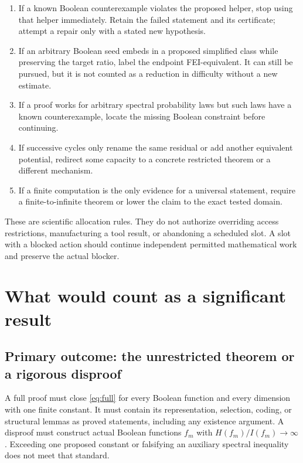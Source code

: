 \documentclass[11pt]{article}
\begin{document}
\begin{enumerate}
\item If a known Boolean counterexample violates the proposed helper, stop using that helper immediately. Retain the failed statement and its certificate; attempt a repair only with a stated new hypothesis.
\item If an arbitrary Boolean seed embeds in a proposed simplified class while preserving the target ratio, label the endpoint FEI-equivalent. It can still be pursued, but it is not counted as a reduction in difficulty without a new estimate.
\item If a proof works for arbitrary spectral probability laws but such laws have a known counterexample, locate the missing Boolean constraint before continuing.
\item If successive cycles only rename the same residual or add another equivalent potential, redirect some capacity to a concrete restricted theorem or a different mechanism.
\item If a finite computation is the only evidence for a universal statement, require a finite-to-infinite theorem or lower the claim to the exact tested domain.
\end{enumerate}

These are scientific allocation rules. They do not authorize overriding access restrictions, manufacturing a tool result, or abandoning a scheduled slot. A slot with a blocked action should continue independent permitted mathematical work and preserve the actual blocker.

\section{What would count as a significant result}

\subsection{Primary outcome: the unrestricted theorem or a rigorous disproof}

A full proof must close \eqref{eq:full} for every Boolean function and every dimension with one finite constant. It must contain its representation, selection, coding, or structural lemmas as proved statements, including any existence argument. A disproof must construct actual Boolean functions $f_m$ with $H(f_m)/I(f_m)\to\infty$. Exceeding one proposed constant or falsifying an auxiliary spectral inequality does not meet that standard.
\end{document}
